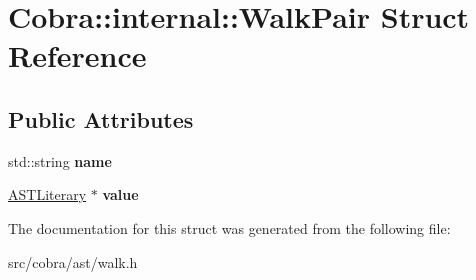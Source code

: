 \hypertarget{struct_cobra_1_1internal_1_1_walk_pair}{\section{Cobra\+:\+:internal\+:\+:Walk\+Pair Struct Reference}
\label{struct_cobra_1_1internal_1_1_walk_pair}
}
\subsection*{Public Attributes}
\begin{DoxyCompactItemize}
\item 
\hypertarget{struct_cobra_1_1internal_1_1_walk_pair_acf74ff0677b510c8bec36effd8342f58}{std\+::string {\bfseries name}}\label{struct_cobra_1_1internal_1_1_walk_pair_acf74ff0677b510c8bec36effd8342f58}

\item 
\hypertarget{struct_cobra_1_1internal_1_1_walk_pair_abe52c94aa907ea2a5191e30b0991770c}{\hyperlink{class_cobra_1_1internal_1_1_a_s_t_literary}{A\+S\+T\+Literary} $\ast$ {\bfseries value}}\label{struct_cobra_1_1internal_1_1_walk_pair_abe52c94aa907ea2a5191e30b0991770c}

\end{DoxyCompactItemize}


The documentation for this struct was generated from the following file\+:\begin{DoxyCompactItemize}
\item 
src/cobra/ast/walk.\+h\end{DoxyCompactItemize}
